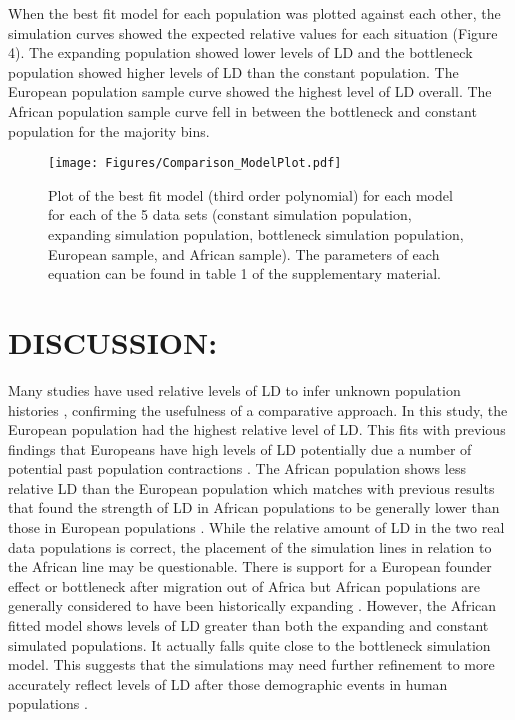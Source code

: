 \documentclass[11pt]{article}
\begin{document}
\begin{linenumbers}
When the best fit model for each population was plotted against each other, the simulation curves showed the expected relative values for each situation (Figure 4). The expanding population showed lower levels of LD and the bottleneck population showed higher levels of LD than the constant population. The European population sample curve showed the highest level of LD overall. The African population sample curve fell in between the bottleneck and constant population for the majority bins. 


\begin{figure}[htp]
\begin{center}
\texttt{[image: Figures/Comparison\_ModelPlot.pdf]}
\caption{\small Plot of the best fit model (third order polynomial) for each model for each of the 5 data sets (constant simulation population, expanding simulation population, bottleneck simulation population, European sample, and African sample). The parameters of each equation can be found in table 1 of the supplementary material.}
\end{center}
\end{figure}

\section{DISCUSSION:}

Many studies have used relative levels of LD to infer unknown population histories \citep{reich2001linkage,gray2009linkage}, confirming the usefulness of a comparative approach. In this study, the European population had the highest relative level of LD. This fits with previous findings that Europeans have high levels of LD potentially due a number of potential past population contractions \citep{reich2001linkage}. The African population shows less relative LD than the European population which matches with previous results that found the strength of LD in African populations to be generally lower than those in European populations \citep{reich2001linkage}. While the relative amount of LD in the two real data populations is correct, the placement of the simulation lines in relation to the African line may be questionable. There is support for a European founder effect or bottleneck after migration out of Africa \citep{reich2001linkage} but African populations are generally considered to have been historically expanding \citep{kruglyak1999prospects}. However, the African fitted model shows levels of LD greater than both the expanding and constant simulated populations. It actually falls quite close to the bottleneck simulation model. This suggests that the simulations may need further refinement to more accurately reflect levels of LD after those demographic events in human populations \citep{pritchard2001linkage}.      


\end{linenumbers}
\end{document}
